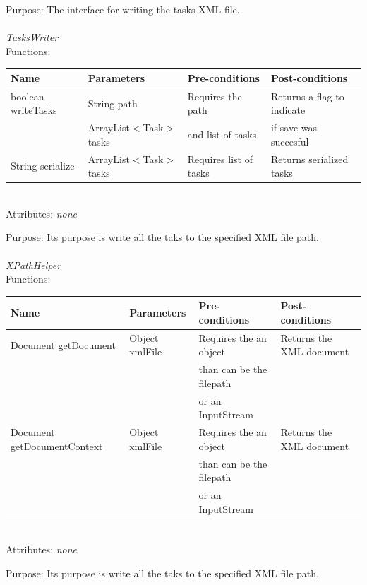 Purpose: The interface for writing the tasks XML file.
\\
\\
\emph{TasksWriter}\\
Functions:\\
\begin{tabular}{| l | l | l | l |}
\hline
Name & Parameters & Pre-conditions & Post-conditions\\
\hline
		boolean writeTasks 			& String path       			& Requires the path		& Returns a flag to indicate \\
                                                                                    & ArrayList$<$Task$>$ tasks             & and list of tasks 		 &  if save was succesful \\
		String serialize 			& ArrayList$<$Task$>$ tasks		& Requires list of tasks	& Returns serialized tasks
\\
\hline
\end{tabular}
\\

Attributes: \emph{none}

Purpose: Its purpose is write all the taks to the specified XML file path.
\\
\\

\emph{XPathHelper}\\
Functions:\\
\begin{tabular}{| l | l | l | l |}
\hline
Name & Parameters & Pre-conditions & Post-conditions\\
\hline
		Document getDocument 		& Object xmlFile       			& Requires the an object	& Returns the XML document \\
                                                                                    & 				             & than can be the filepath    &   \\
							& 					& or an InputStream	& \\
		Document getDocumentContext	& Object xmlFile       			& Requires the an object	& Returns the XML document \\
                                                                                    & 				             & than can be the filepath    &   \\
							& 					& or an InputStream	&
\\
\hline
\end{tabular}
\\

Attributes: \emph{none}

Purpose: Its purpose is write all the taks to the specified XML file path.
\\
\\